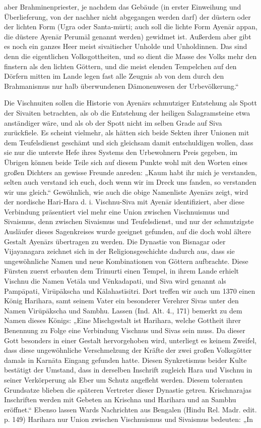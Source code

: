 \documentclass{article}
\begin{document}
aber Brahminenpriester, je nachdem das Gebäude (in erster Einweihung und Überlieferung, von der nachher nicht abgegangen werden darf) der düstern oder der lichten Form (Ugra oder Santa-m\={u}rti; auch soll die lichte Form Ayen\={a}r appan, die düstere Ayen\={a}r Perum\={a}l genannt werden) gewidmet ist. Außerdem aber gibt es noch ein ganzes Heer meist sivaitischer Unholde und Unholdinnen. Das sind denn die eigentlichen Volksgottheiten, und so dient die Masse des Volks mehr den finstern als den lichten Göttern, und die meist elenden Tempelchen auf den Dörfern mitten im Lande legen fast alle Zeugnis ab von dem durch den Brahmanismus nur halb überwundenen Dämonenwesen der Urbevölkerung.“

Die Vischnuiten sollen die Historie von Ayen\={a}rs schmutziger Entstehung als Spott der Sivaiten betrachten, als ob die Entstehung der heiligen Salagramsteine etwa anständiger wäre, und als ob der Spott nicht im selben Grade auf Siva zurückfiele. Es scheint vielmehr, als hätten sich beide Sekten ihrer Unionen mit dem Teufelsdienst geschämt und sich gleichsam damit entschuldigen wollen, dass sie nur die unterste Hefe ihres Systems den Urbewohnern Preis gegeben, im Übrigen können beide Teile sich auf diesem Punkte wohl mit den Worten eines großen Dichters an gewisse Freunde anreden: „Kaum habt ihr mich je verstanden, selten auch verstand ich euch, doch wenn wir im Dreck uns fanden, so verstanden wir uns gleich.“ Gewöhnlich, wie auch die obige Namenliste Ayen\={a}rs zeigt, wird der nordische Hari-Hara d. i. Vischnu-Siva mit Ayen\={a}r identifiziert, aber diese Verbindung präsentiert viel mehr eine Union zwischen Vischnuismus und Sivaismus, denn zwischen Sivaismus und Teufelsdienst, und nur der schmutzigste Ausläufer dieses Sagenkreises wurde geeignet gefunden, auf die doch wohl ältere Gestalt Ayen\={a}rs übertragen zu werden. Die Dynastie von Bisnagar oder Vijayanagara zeichnet sich in der Religionsgeschichte dadurch aus, dass sie ungewöhnliche Namen und neue Kombinationen von Göttern aufbrachte. Diese Fürsten zuerst erbauten dem Trimurti einen Tempel, in ihrem Lande erhielt Vischnu die Namen Vet\={a}la und V\={e}nkadapati, und Siva wird genannt als Pamp\={a}pati, Vir\={u}p\={a}kscha und K\={a}lahast\={i}sitri. Dort treffen wir auch um 1370 einen König Harihara, samt seinem Vater ein besonderer Verehrer Sivas unter den Namen Vir\={u}p\={a}kscha und Sambhu. Lassen (Ind. Alt. 4., 171) bemerkt zu dem Namen dieses Königs: „Eine Mischgestalt ist Harihara, welche Gottheit ihrer Benennung zu Folge eine Verbindung Vischnus und Sivas sein muss. Da dieser Gott besonders in einer Gestalt hervorgehoben wird, unterliegt es keinem Zweifel, dass diese ungewöhnliche Verschmelzung der Kräfte der zwei großen Volksgötter damals in Karn\={a}ta Eingang gefunden hatte. Diesen Synkretismus beider Kulte bestätigt der Umstand, dass in derselben Inschrift zugleich Hara und Vischnu in seiner Verkörperung als Eber um Schutz angefleht werden. Diesem toleranten Grundsatze blieben die späteren Vertreter dieser Dynastie getreu. Krischnarajas Inschriften werden mit Gebeten an Krischna und Harihara und an Sambhu eröffnet.“ Ebenso lassen Wards Nachrichten aus Bengalen (Hindu Rel. Madr. edit. p. 149) Harihara nur Union zwischen Vischnuismus und Sivaismus bedeuten: „In 
\end{document}

